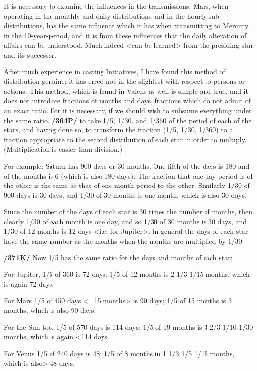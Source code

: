 It is necessary to examine the influences in the transmissions: Mars, when operating in the monthly and daily distributions and in the hourly sub-distributions, has the same influence which it has when transmitting to Mercury in the 10-year-period, and it is from these influences that the daily alteration of affairs can be understood. Much indeed <can be learned> from the presiding star and its successor.

After much experience in casting Initiatives, I have found this method of distribution genuine; it has erred not in the slightest with respect to persons or actions. This method, which is found in Valens as well is simple and true, and it does not introduce fractions of months and days, fractions which do not admit of an exact ratio. For it is necessary, if we should wish to subsume everything under the same ratio, \textbf{/364P/} to take 1/5, 1/30, and 1/360 of the period of each of the stars, and having done so, to transform the
fraction (1/5, 1/30, 1/360) to a fraction appropriate to the second distribution of each star in order to multiply. (Multiplication is easier than division.) 

For example: Saturn has 900 days or 30 months. One fifth of the days is 180 and of the months is 6 (which is also 180 days). The fraction that one day-period is of the other is the same as that of one month-period to the other. Similarly 1/30 of 900 days is 30 days, and 1/30 of 30 months is one month, which is also 30 days.

Since the number of the days of each star is 30 times the number of months, then clearly 1/30 of each month is one day, and so 1/30 of 30 months is 30 days, and 1/30 of 12 months is 12 days <i.e. for Jupiter>. In general the days of each star have the same number as the months when the months are multiplied by 1/30.

\textbf{/371K/} Now 1/5 has the same ratio for the days and months of each star: 

For Jupiter, 1/5 of 360 is 72 days; 1/5 of 12 months is 2 1/3 1/15 months, which is again 72 days. 

For Mars 1/5 of 450 days <=15 months> is 90 days; 1/5 of 15 months is 3 months, which is also 90 days.

For the Sun too, 1/5 of 570 days is 114 days; 1/5 of 19 months is 3 2/3 1/10 1/30 months, which is again <114 days.

For Venus 1/5 of 240 days is 48; 1/5 of 8 months in 1 1/3 1/5 1/15 months, which is also> 48 days.

